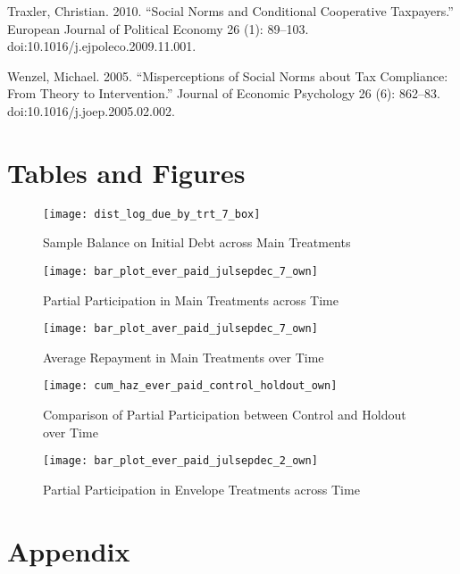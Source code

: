 \documentclass[12pt,titlepage]{article}
\begin{document}
Traxler, Christian. 2010. “Social Norms and Conditional Cooperative Taxpayers.” European Journal of Political Economy 26 (1): 89–103. doi:10.1016/j.ejpoleco.2009.11.001.

Wenzel, Michael. 2005. “Misperceptions of Social Norms about Tax Compliance: From Theory to Intervention.” Journal of Economic Psychology 26 (6): 862–83. doi:10.1016/j.joep.2005.02.002.

\section{Tables and Figures}



\begin{figure}[htpb]
\begin{center}
\caption{Sample Balance on Initial Debt across Main Treatments}
\label{fig:box_bal}
\bigskip
\texttt{[image: dist\_log\_due\_by\_trt\_7\_box]}
\end{center}
\end{figure}

\begin{figure}[htpb]
\begin{center}
\caption{Partial Participation in Main Treatments across Time}
\label{fig:ep_time_7_own}
\bigskip
\texttt{[image: bar\_plot\_ever\_paid\_julsepdec\_7\_own]}
\end{center}
\end{figure}

\begin{figure}[htpb]
\begin{center}
\caption{Average Repayment in Main Treatments over Time}
\label{fig:tp_time_7_own}
\bigskip
\texttt{[image: bar\_plot\_aver\_paid\_julsepdec\_7\_own]}
\end{center}
\end{figure}

\begin{figure}[htpb]
\begin{center}
\caption{Comparison of Partial Participation between Control and Holdout over Time}
\label{fig:ep_time_ch_own}
\bigskip
\texttt{[image: cum\_haz\_ever\_paid\_control\_holdout\_own]}
\end{center}
\end{figure}

\begin{figure}[htpb]
\begin{center}
\caption{Partial Participation in Envelope Treatments across Time}
\label{fig:ep_time_2_own}
\bigskip
\texttt{[image: bar\_plot\_ever\_paid\_julsepdec\_2\_own]}
\end{center}
\end{figure}

\section{Appendix}

\end{document}
